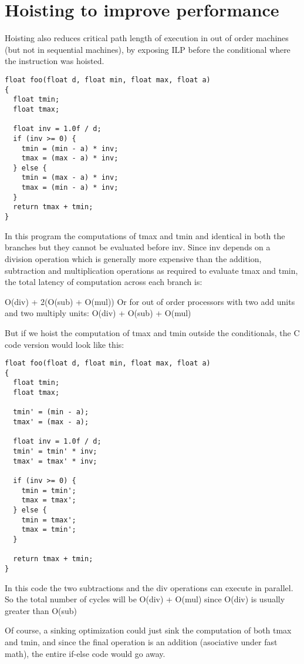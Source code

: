 \documentclass{sig-alternate}
\begin{document}
\section{Hoisting to improve performance}
Hoisting also reduces critical path length of execution in out of
order machines (but not in sequential machines), by exposing ILP
before the conditional where the instruction was hoisted.

\begin{verbatim}
float foo(float d, float min, float max, float a)
{
  float tmin;
  float tmax;

  float inv = 1.0f / d;
  if (inv >= 0) {
    tmin = (min - a) * inv;
    tmax = (max - a) * inv;
  } else {
    tmin = (max - a) * inv;
    tmax = (min - a) * inv;
  }
  return tmax + tmin;
}
\end{verbatim}

In this program the computations of tmax and tmin and identical in
both the branches but they cannot be evaluated before inv. Since inv
depends on a division operation which is generally more expensive than
the addition, subtraction and multiplication operations as required to
evaluate tmax and tmin, the total latency of computation across each
branch is:

O(div) + 2(O(sub) + O(mul))
Or for out of order processors with two add units and two multiply units:
O(div) + O(sub) + O(mul)

But if we hoist the computation of tmax and tmin outside the
conditionals, the C code version would look like this:
\begin{verbatim}
float foo(float d, float min, float max, float a)
{
  float tmin;
  float tmax;

  tmin' = (min - a);
  tmax' = (max - a);

  float inv = 1.0f / d;
  tmin' = tmin' * inv;
  tmax' = tmax' * inv;

  if (inv >= 0) {
    tmin = tmin';
    tmax = tmax';
  } else {
    tmin = tmax';
    tmax = tmin';
  }

  return tmax + tmin;
}

\end{verbatim}

In this code the two subtractions and the div operations can execute
in parallel. So the total number of cycles will be O(div) + O(mul)
since O(div) is usually greater than O(sub)

Of course, a sinking optimization could just sink the computation of
both tmax and tmin, and since the final operation is an addition
(asociative under fast math), the entire if-else code would go away.
\end{document}

